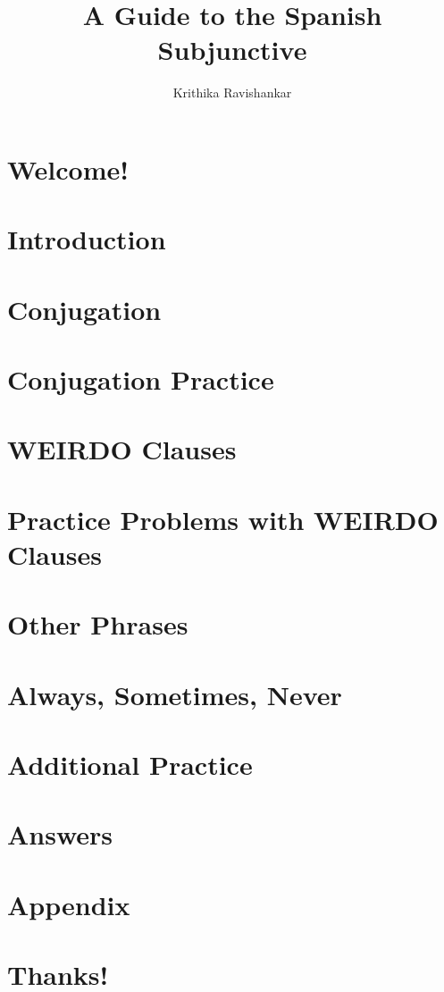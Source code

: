 \documentclass[12pt, oneside]{book}
\title{A Guide to the Spanish Subjunctive}
\author{Krithika Ravishankar}
\begin{document}
\sloppy
\maketitle
\tableofcontents
\listoftables
\chapter{Welcome!}



\chapter{Introduction}

\chapter{Conjugation}

\chapter{Conjugation Practice}

\chapter{WEIRDO Clauses}

\chapter{Practice Problems with WEIRDO Clauses}

\chapter{Other Phrases}

\chapter{Always, Sometimes, Never}

\chapter{Additional Practice}

\chapter{Answers}

\chapter{Appendix}
\label{sec:appendix}


\chapter{Thanks!}

\end{document}
